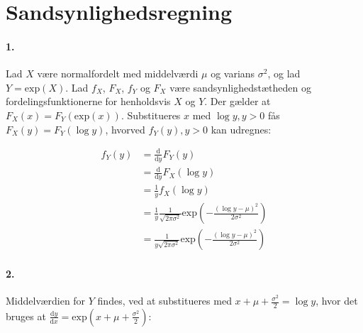\section{Sandsynlighedsregning}
\newcommand{\diff}{\mathrm{d}}

\paragraph{1.} Lad $X$ være normalfordelt med middelværdi $\mu$ og
varians $\sigma^2$, og lad $Y=\mathrm{exp}(X)$. Lad $f_X$, $F_X$, $f_Y$ og $F_X$ være
sandsynlighedstætheden og fordelingsfunktionerne for henholdsvis $X$ og $Y$. Der
gælder at $F_X(x) =
F_Y(\mathrm{exp}(x))$. Substitueres $x$ med $\log y, y > 0$
fås $F_X(y) = F_Y(\log y)$, hvorved $f_Y(y), y > 0$ kan udregnes:

\begin{align*}
f_Y(y) &= \frac{\diff}{\diff y} F_Y(y) \\
&= \frac{\diff}{\diff y} F_X(\log y) \\
&= \frac{1}{y} f_X(\log y) \\
&= \frac{1}{y} \frac{1}{\sqrt{2\pi\sigma^2}}\mathrm{exp}\left( -\frac{(\log y - \mu)^2}{2\sigma^2} \right) \\ 
&= \frac{1}{y\sqrt{2\pi\sigma^2}}\mathrm{exp}\left( -\frac{(\log y - \mu)^2}{2\sigma^2} \right) 
\end{align*}


\paragraph{2.} Middelværdien for $Y$ findes, ved at substitueres med $x + \mu
+ \frac{\sigma^2}{2} = \log y$, hvor det bruges at $\frac{\diff
y}{\diff x} = \mathrm{exp}(x + \mu + \frac{\sigma^2}{2})$:

